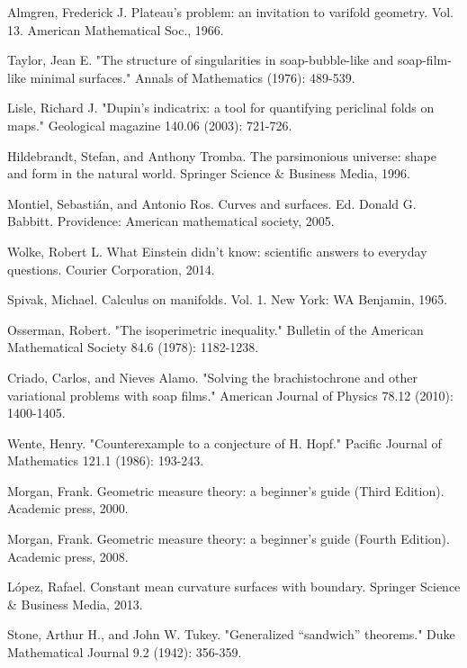 \documentclass[a4paper,12pt]{report}
\begin{document}
\medskip
 
\begin{thebibliography}{9}

Almgren, Frederick J. Plateau's problem: an invitation to varifold geometry. Vol. 13. American Mathematical Soc., 1966.

Taylor, Jean E. "The structure of singularities in soap-bubble-like and soap-film-like minimal surfaces." Annals of Mathematics (1976): 489-539.

Lisle, Richard J. "Dupin's indicatrix: a tool for quantifying periclinal folds on maps." Geological magazine 140.06 (2003): 721-726.

Hildebrandt, Stefan, and Anthony Tromba. The parsimonious universe: shape and form in the natural world. Springer Science \& Business Media, 1996.

Montiel, Sebastián, and Antonio Ros. Curves and surfaces. Ed. Donald G. Babbitt. Providence: American mathematical society, 2005.

Wolke, Robert L. What Einstein didn't know: scientific answers to everyday questions. Courier Corporation, 2014.

Spivak, Michael. Calculus on manifolds. Vol. 1. New York: WA Benjamin, 1965.

Osserman, Robert. "The isoperimetric inequality." Bulletin of the American Mathematical Society 84.6 (1978): 1182-1238.

Criado, Carlos, and Nieves Alamo. "Solving the brachistochrone and other variational problems with soap films." American Journal of Physics 78.12 (2010): 1400-1405.

Wente, Henry. "Counterexample to a conjecture of H. Hopf." Pacific Journal of Mathematics 121.1 (1986): 193-243.

Morgan, Frank. Geometric measure theory: a beginner's guide (Third Edition). Academic press, 2000.

Morgan, Frank. Geometric measure theory: a beginner's guide (Fourth Edition). Academic press, 2008.

L\'opez, Rafael. Constant mean curvature surfaces with boundary. Springer Science \& Business Media, 2013.

Stone, Arthur H., and John W. Tukey. "Generalized “sandwich” theorems." Duke Mathematical Journal 9.2 (1942): 356-359.


\end{thebibliography}
\end{document}
